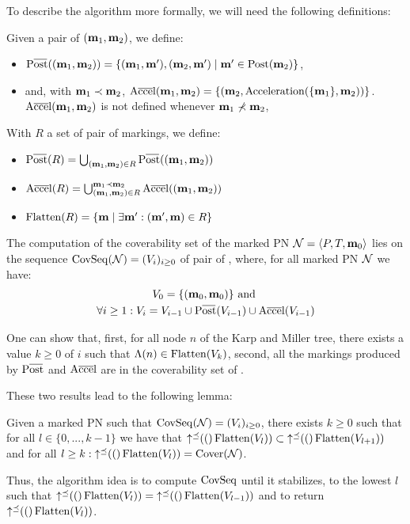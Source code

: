 To describe the algorithm more formally, we will need the following definitions:

Given a pair of \omarks $(\mathbf{m}_1, \mathbf{m}_2)$, we define:
\begin{itemize}
  \item $\Postb((\mar_1, \mar_2)) = \{(\mar_1, \mar'), (\mar_2, \mar') \mid \mar' \in \Post(\mar_2)\}$,
  \item and, with $\mathbf{m}_1 \prec \mathbf{m}_2$, $\operatorname{A\overline{cce}l}(\mathbf{m}_1, \mathbf{m}_2) = \{(\mathbf{m}_2, \operatorname{Acceleration}(\{\mathbf{m}_1\}, \mathbf{m}_2))\}$.
    $\operatorname{A\overline{cce}l}(\mathbf{m}_1, \mathbf{m}_2)$ is not defined whenever $\mathbf{m}_1 \nprec \mathbf{m}_2$,
\end{itemize}

With $R$ a set of pair of markings, we define:
\begin{itemize}
  \item $\Postb(R) = \bigcup_{(\mar_1, \mar_2) \in R} \Postb((\mar_1, \mar_2))$
  \item $\operatorname{A\overline{cce}l}(R) = \bigcup_{(\mathbf{m}_1, \mathbf{m}_2) \in R}^{\mathbf{m}_1 \prec \mathbf{m}_2} \operatorname{A\overline{cce}l}((\mathbf{m}_1, \mathbf{m}_2))$
  \item $\operatorname{Flatten}(R) = \{\mathbf{m} \mid \exists \mathbf{m}' : (\mathbf{m}', \mathbf{m}) \in R\}$
\end{itemize}

The computation of the coverability set of the marked \ac{PN} $\mathcal{N} = \langle P,T, \mathbf{m}_0\rangle$ lies on the sequence $\operatorname{CovSeq}(\mathcal{N}) = (V_i)_{i \geq 0}$ of pair of \omarks, where, for all marked \ac{PN} $\mathcal{N}$ we have:
\begin{gather*}
  V_0 = \{(\mari, \mari)\} \text{ and } \\
  \forall i \geq 1 : V_i = V_{i-1} \cup \Postb(V_{i-1}) \cup \Accelb(V_{i-1})
\end{gather*}

One can show that,
first, for all node $n$ of the Karp and Miller tree, there exists a value $k \geq 0$ of $i$ such that $\Lambda(n) \in \operatorname{Flatten}(V_k)$,
second, all the markings produced by $\Postb$ and $\operatorname{A\overline{cce}l}$ are in the coverability set of \namePN.

These two results lead to the following lemma:
\begin{lemm}
  Given a marked \ac{PN} \namePN such that $\operatorname{CovSeq}(\mathcal{N}) = (V_i)_{i \geq 0}$,
  there exists $k \geq 0$ such that for all $l \in \{0, ..., k-1\}$ we have that $\operatorname{\uparrow^\preceq}(()\operatorname{Flatten}(V_l)) \subset \operatorname{\uparrow^\preceq}(()\operatorname{Flatten}(V_{l+1}))$
  and for all $l \geq k : \operatorname{\uparrow^\preceq}(()\operatorname{Flatten}(V_l)) = \operatorname{Cover}(\mathcal{N})$.
\end{lemm}

Thus, the algorithm idea is to compute $\operatorname{CovSeq}$ until it stabilizes,  to the lowest $l$ such that $\operatorname{\uparrow^\preceq}(()\operatorname{Flatten}(V_l)) = \operatorname{\uparrow^\preceq}(()\operatorname{Flatten}(V_{l-1}))$ and to return $\operatorname{\uparrow^\preceq}(()\operatorname{Flatten}(V_l))$.

